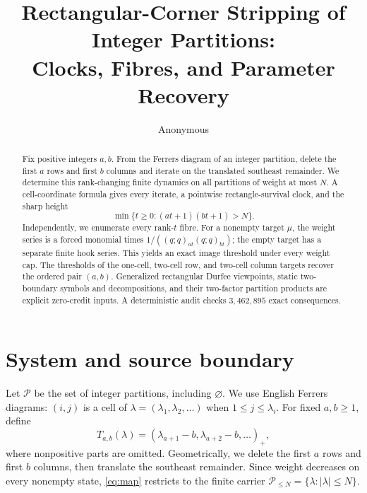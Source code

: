 \documentclass[a4paper,10pt]{amsart}
\title[Rectangular-corner stripping]{Rectangular-Corner Stripping of Integer Partitions:\\Clocks, Fibres, and Parameter Recovery}
\author{Anonymous}
\date{}
\theoremstyle{remark}
\newcommand{\Part}{\mathcal P}
\newcommand{\emptypar}{\varnothing}
\newcommand{\qfac}[1]{(q;q)_{#1}}
\begin{document}
\begin{abstract}
Fix positive integers $a,b$.  From the Ferrers diagram of an integer
partition, delete the first $a$ rows and first $b$ columns and iterate on the
translated southeast remainder.  We determine this rank-changing finite
dynamics on all partitions of weight at most $N$.  A cell-coordinate formula
gives every iterate, a pointwise rectangle-survival clock, and the sharp
height
\[
 \min\{t\geq0:(at+1)(bt+1)>N\}.
\]
Independently, we enumerate every rank-$t$ fibre.  For a nonempty target
$\mu$, the weight series is a forced monomial times
$1/(\qfac{at}\qfac{bt})$; the empty target has a separate finite hook
series.  This yields an exact image threshold under every weight cap.  The
thresholds of the one-cell, two-cell row, and two-cell column targets recover
the ordered pair $(a,b)$.  Generalized rectangular Durfee viewpoints, static
two-boundary symbols and decompositions, and their two-factor partition
products are explicit zero-credit inputs.
A deterministic audit checks $3{,}462{,}895$ exact consequences.
\end{abstract}

\maketitle

\section{System and source boundary}\label{sec:setup}

Let $\Part$ be the set of integer partitions, including $\emptypar$.  We use
English Ferrers diagrams: $(i,j)$ is a cell of
$\lambda=(\lambda_1,\lambda_2,\ldots)$ when
$1\leq j\leq\lambda_i$.  For fixed $a,b\geq1$, define
\begin{equation}\label{eq:map}
 T_{a,b}(\lambda)
  =(\lambda_{a+1}-b,\lambda_{a+2}-b,\ldots)_+,
\end{equation}
where nonpositive parts are omitted.  Geometrically, we delete the first $a$
rows and first $b$ columns, then translate the southeast remainder.  Since
weight decreases on every nonempty state, \eqref{eq:map} restricts to the
finite carrier $\Part_{\leq N}=\{\lambda:|\lambda|\leq N\}$.
\end{document}
